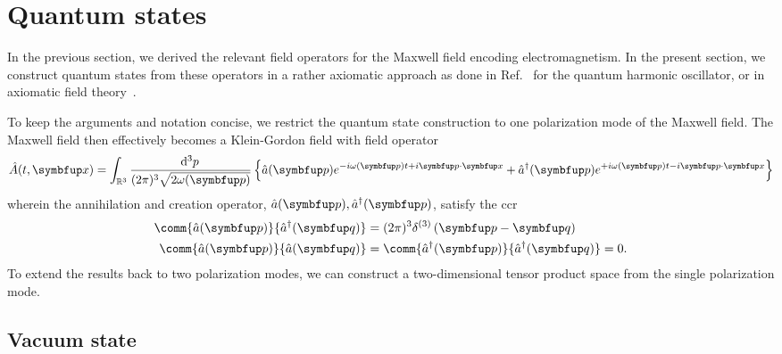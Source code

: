 \section{Quantum states}

In the previous section, we derived the relevant field operators for the Maxwell field encoding electromagnetism.
In the present section, we construct quantum states from these operators in a rather axiomatic approach as done in Ref.~\cite[p.~506]{Cohen2019} for the quantum harmonic oscillator, or in axiomatic field theory~\cite{Streater2016,Haag2012,Bogolubov1989}.

To keep the arguments and notation concise, we restrict the quantum state construction to one polarization mode of the Maxwell field.
The Maxwell field then effectively becomes a Klein-Gordon field with field operator
\begin{equation}
	\hat{A}(t,\vb{x})
	=
	\int_{\mathbb{R}^3}\frac{\dd[3]{p}}{(2\pi)^3\sqrt{2\omega(\vb{p})}}
	\left\{
		\hat{a}(\vb{p})
		e^{-i\omega(\vb{p})t+i\vb{p}\vdot\vb{x}}
		+
		\hat{a}^\dagger(\vb{p})
		e^{+i\omega(\vb{p})t-i\vb{p}\vdot\vb{x}}
	\right\}
	\label{eq:klein_gordon_operator}
\end{equation}
wherein the annihilation and creation operator, $\hat{a}(\vb{p}),\hat{a}^\dagger(\vb{p})$, satisfy the \gls{ccr}
\begin{align}
	\comm{\hat{a}(\vb{p})}{\hat{a}^\dagger(\vb{q})}
	&=
	(2\pi)^3\delta^{(3)}
	\left(\vb{p}-\vb{q}\right)
	\\
	\comm{\hat{a}(\vb{p})}{\hat{a}(\vb{q})}
	&=
	\comm{\hat{a}^\dagger(\vb{p})}{\hat{a}^\dagger(\vb{q})}
	=
	0
	\label{eq:klein_gordon_canonical_commutation_relation}.
\end{align}
To extend the results back to two polarization modes, we can construct a two-dimensional tensor product space from the single polarization mode.

\subsection{Vacuum state}

